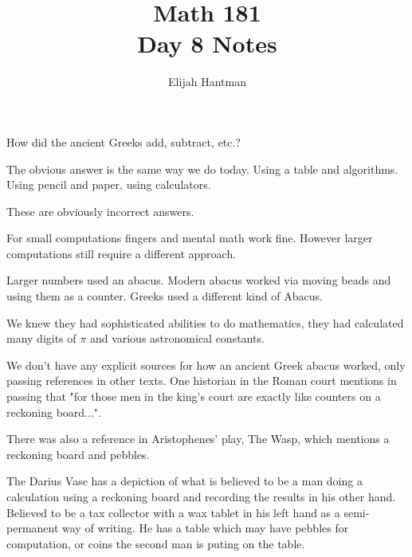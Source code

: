\documentclass{report}
\title{\Huge{Math 181}\\Day 8 Notes}
\author{\huge{Elijah Hantman}}
\date{}
\begin{document}
\maketitle
\newpage

\begin{description}
    \item {\large How did the ancient Greeks add,
        subtract, etc.?}
        \begin{mdframed}
           The obvious answer is the same way we
           do today. Using a table and algorithms.
           Using pencil and paper, using calculators.

           These are obviously incorrect answers.
        \end{mdframed}
        \begin{mdframed}
            For small computations fingers and mental math
            work fine. However larger computations still
            require a different approach.
        \end{mdframed}
        \begin{mdframed}
           Larger numbers used an abacus. Modern abacus worked
           via moving beads and using them as a counter. Greeks
           used a different kind of Abacus.

           \vspace{10pt}

           We knew they had sophisticated abilities to do
           mathematics, they had calculated many digits of
           $\pi$ and various astronomical constants.

           We don't have any explicit sources for how an
           ancient Greek abacus worked, only passing references
           in other texts. One historian in the Roman court
           mentions in passing that "for those men in the king's
           court are exactly like counters on a reckoning 
           board...".

           There was also a reference in Aristophenes' play,
           The Wasp, which mentions a reckoning board and
           pebbles.

           \vspace{10pt}

            The Darius Vase has a depiction of what is
            believed to be a man doing a calculation using
            a reckoning board and recording the results
            in his other hand. Believed to be a tax collector
            with a wax tablet in his left hand as a semi-permanent
            way of writing. He has a table which may have pebbles
            for computation, or coins the second man is puting on
            the table.


\end{mdframed}
\end{description}
\end{document}

